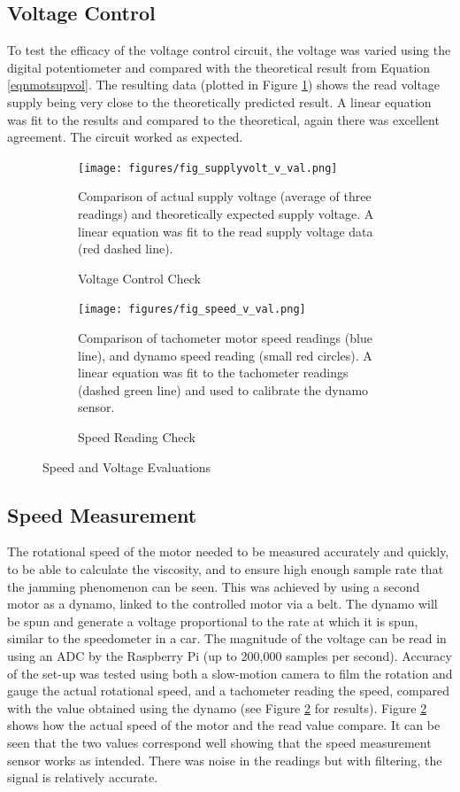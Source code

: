 \documentclass[twoside,a4]{report}
\def\br{\newline \newline \noindent}
\begin{document}
	\subsection*{Voltage Control}
	To test the efficacy of the voltage control circuit, the voltage was varied using the digital potentiometer and compared with the theoretical result from Equation \ref{eqnmotsupvol}. The resulting data (plotted in Figure \ref{figvoltvval}) shows the read voltage supply being very close to the theoretically predicted result. A linear equation was fit to the results and compared to the theoretical, again there was excellent agreement. The circuit worked as expected.
	\begin{figure}[!htb]
		\centering
		\begin{subfigure}[t]{0.45\textwidth}
			\centering
			\texttt{[image: figures/fig\_supplyvolt\_v\_val.png]}
			\caption{Voltage Control Check}
			\label{figvoltvval}
			\footnotesize
			Comparison of actual supply voltage (average of three readings) and theoretically expected supply voltage. A linear equation was fit to the read supply voltage data (red dashed line).
		\end{subfigure}
		\begin{subfigure}[t]{0.45\textwidth}
			\centering
			\texttt{[image: figures/fig\_speed\_v\_val.png]}
			\caption{Speed Reading Check}
			\label{figdynocheck}
			\footnotesize
			Comparison of tachometer motor speed readings (blue line), and dynamo speed reading (small red circles). A linear equation was fit to the tachometer readings (dashed green line) and used to calibrate the dynamo sensor.
		\end{subfigure}
		\label{figspeecal}
		\caption{Speed and Voltage Evaluations}
	\end{figure}

	\subsection*{Speed Measurement} %
	The rotational speed of the motor needed to be measured accurately and quickly, to be able to calculate the viscosity, and to ensure high enough sample rate that the jamming phenomenon can be seen. This was achieved by using a second motor as a dynamo, linked to the controlled motor via a belt. The dynamo will be spun and generate a voltage proportional to the rate at which it is spun, similar to the speedometer in a car. The magnitude of the voltage can be read in using an ADC by the Raspberry Pi (up to 200,000 samples per second). Accuracy of the set-up was tested using both a slow-motion camera to film the rotation and gauge the actual rotational speed, and a tachometer reading the speed, compared with the value obtained using the dynamo (see Figure \ref{figdynocheck} for results). \br
	Figure \ref{figdynocheck} shows how the actual speed of the motor and the read value compare. It can be seen that the two values correspond well showing that the speed measurement sensor works as intended. There was noise in the readings but with filtering, the signal is relatively accurate.
	
\end{document}
